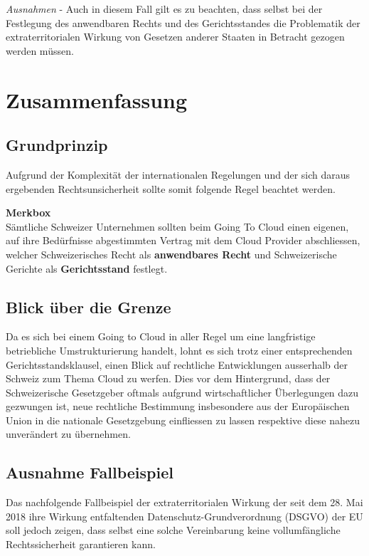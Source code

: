 \documentclass[a4paper,pointlessnumbers]{scrreprt}
\newcommand{\merkbox}[2][0.8\textwidth]{ \begin{center} \begin{tcolorbox}[enhanced, drop fuzzy midday shadow, width={#1}, opacityframe=0.5, colframe=BrickRed, colback=white] {\ECFTeenSpirit \color{BrickRed}\textbf{Merkbox} \qquad {\tiny das gilt es zu beachten}} \\  #2 \end{tcolorbox} \end{center}}
\begin{document}
\textit{Ausnahmen} - Auch in diesem Fall gilt es zu beachten, dass selbst bei der Festlegung des anwendbaren Rechts und des Gerichtsstandes die Problematik der extraterritorialen Wirkung von Gesetzen anderer Staaten in Betracht gezogen werden müssen.

\section{Zusammenfassung}
\subsection{Grundprinzip}
Aufgrund der Komplexität der internationalen Regelungen und der sich daraus ergebenden Rechtsunsicherheit sollte somit folgende Regel beachtet werden.

\merkbox[0.7\textwidth]{Sämtliche Schweizer Unternehmen sollten beim Going To Cloud einen eigenen, auf ihre Bedürfnisse abgestimmten Vertrag mit dem Cloud Provider abschliessen, welcher Schweizerisches Recht als \textbf{anwendbares Recht} und Schweizerische Gerichte als \textbf{Gerichtsstand} festlegt.}

\subsection{Blick über die Grenze}
Da es sich bei einem Going to Cloud in aller Regel um eine langfristige betriebliche Umstrukturierung handelt, lohnt es sich trotz einer entsprechenden Gerichtsstandsklausel, einen Blick auf rechtliche Entwicklungen ausserhalb der Schweiz zum Thema Cloud zu werfen. Dies vor dem Hintergrund, dass der Schweizerische Gesetzgeber oftmals aufgrund wirtschaftlicher Überlegungen dazu gezwungen ist, neue rechtliche Bestimmung insbesondere aus der Europäischen Union in die nationale Gesetzgebung einfliessen zu lassen respektive diese nahezu unverändert zu übernehmen.

\subsection{Ausnahme Fallbeispiel}
Das nachfolgende Fallbeispiel der extraterritorialen Wirkung der seit dem 28. Mai 2018 ihre Wirkung entfaltenden Datenschutz-Grundverordnung (DSGVO) der EU soll jedoch zeigen, dass selbst eine solche Vereinbarung keine vollumfängliche Rechtssicherheit garantieren kann.
\end{document}

